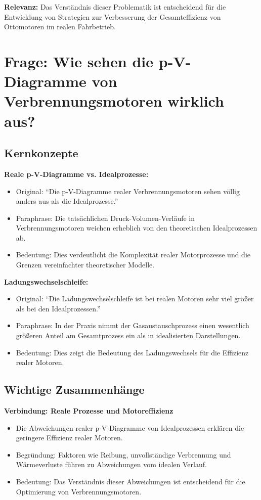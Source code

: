 \documentclass[a4paper,12pt]{article}
\begin{document}
\textbf{Relevanz:} Das Verständnis dieser Problematik ist entscheidend für die Entwicklung von Strategien zur Verbesserung der Gesamteffizienz von Ottomotoren im realen Fahrbetrieb.



\section{Frage: Wie sehen die p-V-Diagramme von Verbrennungsmotoren wirklich aus?}

\subsection{Kernkonzepte}

\textbf{Reale p-V-Diagramme vs. Idealprozesse:}

\begin{itemize}
    \item Original: \enquote{Die p-V-Diagramme realer Verbrennungsmotoren sehen völlig anders aus als die Idealprozesse.}
    \item Paraphrase: Die tatsächlichen Druck-Volumen-Verläufe in Verbrennungsmotoren weichen erheblich von den theoretischen Idealprozessen ab.
    \item Bedeutung: Dies verdeutlicht die Komplexität realer Motorprozesse und die Grenzen vereinfachter theoretischer Modelle.
\end{itemize}

\textbf{Ladungswechselschleife:}

\begin{itemize}
    \item Original: \enquote{Die Ladungswechselschleife ist bei realen Motoren sehr viel größer als bei den Idealprozessen.}
    \item Paraphrase: In der Praxis nimmt der Gasaustauschprozess einen wesentlich größeren Anteil am Gesamtprozess ein als in idealisierten Darstellungen.
    \item Bedeutung: Dies zeigt die Bedeutung des Ladungswechsels für die Effizienz realer Motoren.
\end{itemize}

\subsection{Wichtige Zusammenhänge}

\textbf{Verbindung: Reale Prozesse und Motoreffizienz}

\begin{itemize}
    \item Die Abweichungen realer p-V-Diagramme von Idealprozessen erklären die geringere Effizienz realer Motoren.
    \item Begründung: Faktoren wie Reibung, unvollständige Verbrennung und Wärmeverluste führen zu Abweichungen vom idealen Verlauf.
    \item Bedeutung: Das Verständnis dieser Abweichungen ist entscheidend für die Optimierung von Verbrennungsmotoren.
\end{itemize}
\end{document}
